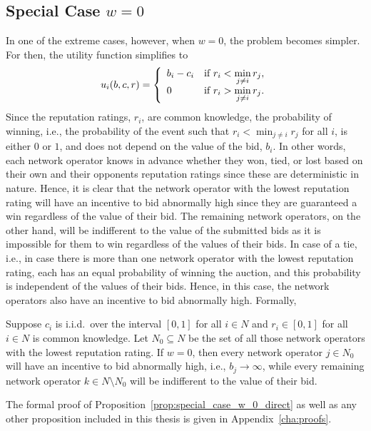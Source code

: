 \subsection{Special Case $w=0$} %
\label{sub:special_case_w_0_direct}
In one of the extreme cases, however, when $w=0$, the problem becomes simpler. For then, the utility function simplifies to
\begin{equation}
	\label{eq:utility_w_0_direct}
	u_i(b,c,r) = \left\{
	\begin{array}{l l}
		b_i-c_i &\text{if } r_i < \displaystyle\min_{j\neq i} r_j,\\
		0 &\text{if } r_i > \displaystyle\min_{j\neq i} r_j.
	\end{array}\right.
\end{equation}
Since the reputation ratings, $r_i$, are common knowledge, the probability of winning, i.e., the probability of the event such that $r_i<\min_{j\neq i}r_j$ for all $i$, is either $0$ or $1$, and does not depend on the value of the bid, $b_i$. In other words, each network operator knows in advance whether they won, tied, or lost based on their own and their opponents reputation ratings since these are deterministic in nature. Hence, it is clear that the network operator with the lowest reputation rating will have an incentive to bid abnormally high since they are guaranteed a win regardless of the value of their bid. The remaining network operators, on the other hand, will be indifferent to the value of the submitted bids as it is impossible for them to win regardless of the values of their bids. In case of a tie, i.e., in case there is more than one network operator with the lowest reputation rating, each has an equal probability of winning the auction, and this probability is independent of the values of their bids. Hence, in this case, the network operators also have an incentive to bid abnormally high. Formally,
\begin{proposition}
\label{prop:special_case_w_0_direct}
Suppose $c_i$ is i.i.d.~over the interval $[0,1]$ for all $i\in N$ and $r_i\in [0,1]$ for all $i\in N$ is common knowledge. Let $N_0\subseteq N$ be the set of all those network operators with the lowest reputation rating. If $w=0$, then every network operator $j\in N_0$ will have an incentive to bid abnormally high, i.e., $b_j\rightarrow\infty$, while every remaining network operator $k\in N\setminus N_0$ will be indifferent to the value of their bid.
\end{proposition}
\noindent The formal proof of Proposition~\ref{prop:special_case_w_0_direct} as well as any other proposition included in this thesis is given in Appendix~\ref{cha:proofs}.

